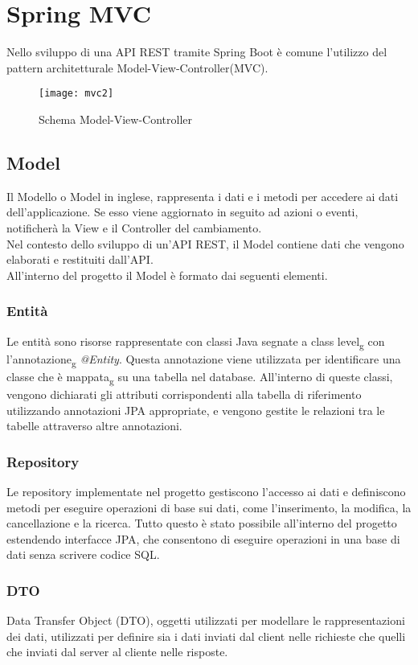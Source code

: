 \section{Spring MVC}
Nello sviluppo di una API REST tramite Spring Boot è comune l'utilizzo del pattern architetturale Model-View-Controller(MVC).\\

\begin{figure}[H] 
    \centering 
    \texttt{[image: mvc2]} 
    \caption{Schema Model-View-Controller}
\end{figure}

\subsection{Model}
Il Modello o Model in inglese, rappresenta i dati e i metodi per accedere ai dati dell'applicazione. Se esso viene aggiornato in seguito ad azioni o eventi, notificherà la View e il Controller del cambiamento.\\
Nel contesto dello sviluppo di un'API REST, il Model contiene dati che vengono elaborati e restituiti dall'API.\\
All'interno del progetto il Model è formato dai seguenti elementi.
\subsubsection*{Entità}
Le entità sono risorse rappresentate con classi Java segnate a class level\textsubscript{g} con l'annotazione\textsubscript{g} \textit{@Entity}. Questa annotazione viene utilizzata per identificare una classe che è mappata\textsubscript{g} su una tabella nel database. All'interno di queste classi, vengono dichiarati gli attributi corrispondenti alla tabella di riferimento utilizzando annotazioni JPA appropriate, e vengono gestite le relazioni tra le tabelle attraverso altre annotazioni.
\subsubsection*{Repository}
Le repository implementate nel progetto gestiscono l'accesso ai dati e definiscono metodi per eseguire operazioni di base sui dati, come l'inserimento, la modifica, la cancellazione e la ricerca. Tutto questo è stato possibile all'interno del progetto estendendo interfacce JPA, che consentono di eseguire operazioni in una base di dati senza scrivere codice SQL.
\subsubsection*{DTO}
Data Transfer Object (DTO), oggetti utilizzati per modellare le rappresentazioni dei dati, utilizzati per definire sia i dati inviati dal client nelle richieste che quelli che inviati dal server al cliente nelle risposte.\\

